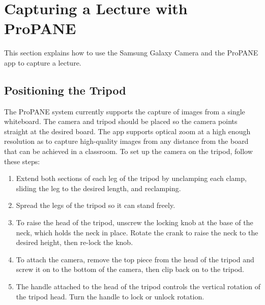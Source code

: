 \documentclass[]{article}
\begin{document}
	\section{Capturing a Lecture with ProPANE}
		This section explains how to use the Samsung Galaxy Camera and the ProPANE app to capture a lecture.
		
		\subsection{Positioning the Tripod}
			The ProPANE system currently supports the capture of images from a single whiteboard.  The camera and tripod should be placed so the camera points straight at the desired board. The app supports optical zoom at a high enough resolution as to capture high-quality images from any distance from the board that can be achieved in a classroom. To set up the camera on the tripod, follow these steps:
			\begin{enumerate}
			\item{Extend both sections of each leg of the tripod by unclamping each clamp, sliding the leg to the desired length, and reclamping.}
			\item{Spread the legs of the tripod so it can stand freely.}
			\item{To raise the head of the tripod, unscrew the locking knob at the base of the neck, which holds the neck in place.  Rotate the crank to raise the neck to the desired height, then re-lock the knob.}
			\item{To attach the camera, remove the top piece from the head of the tripod and screw it on to the bottom of the camera, then clip back on to the tripod.}
			\item{The handle attached to the head of the tripod controls the vertical rotation of the tripod head.  Turn the handle to lock or unlock rotation.}
			\end{enumerate} 
		
\end{document}
